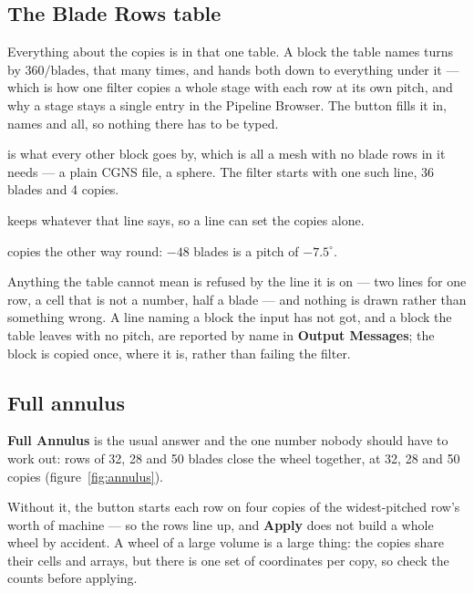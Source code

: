\documentclass[11pt,a4paper]{article}
\newcommand{\prop}[1]{\textbf{#1}}          %
\newcommand{\menu}[1]{\textbf{#1}}          %
\begin{document}
\subsection{The Blade Rows table}

Everything about the copies is in that one table. A block the table names turns
by $360/\text{blades}$, that many times, and hands both down to everything under
it --- which is how one filter copies a whole stage with each row at its own
pitch, and why a stage stays a single entry in the Pipeline Browser. The button
fills it in, names and all, so nothing there has to be typed.

\begin{description}[style=nextline,leftmargin=6mm]
  \item[The line with no name] is what every other block goes by, which is all a
    mesh with no blade rows in it needs --- a plain CGNS file, a sphere. The
    filter starts with one such line, 36 blades and 4 copies.
  \item[An empty cell] keeps whatever that line says, so a line can set the
    copies alone.
  \item[A negative blade count] copies the other way round: $-48$ blades is a
    pitch of $-7.5^\circ$.
\end{description}

Anything the table cannot mean is refused by the line it is on --- two lines for
one row, a cell that is not a number, half a blade --- and nothing is drawn
rather than something wrong. A line naming a block the input has not got, and a
block the table leaves with no pitch, are reported by name in \menu{Output
Messages}; the block is copied once, where it is, rather than failing the
filter.

\subsection{Full annulus}

\prop{Full Annulus} is the usual answer and the one number nobody should have to
work out: rows of 32, 28 and 50 blades close the wheel together, at 32, 28 and
50 copies (figure~\ref{fig:annulus}).

Without it, the button starts each row on four copies of the widest-pitched
row's worth of machine --- so the rows line up, and \menu{Apply} does not build a
whole wheel by accident. A wheel of a large volume is a large thing: the copies
share their cells and arrays, but there is one set of coordinates per copy, so
check the counts before applying.
\end{document}
